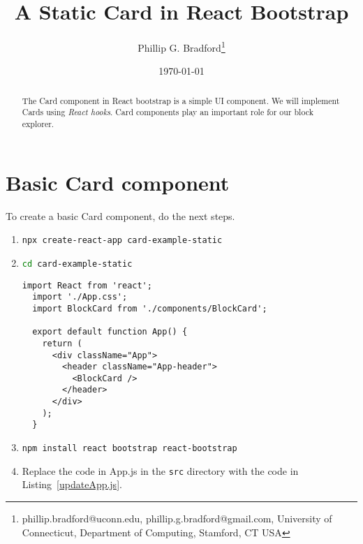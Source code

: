 \documentclass[12pt]{article}
\begin{document}
\title{A Static {\bf Card} in React Bootstrap}
\author{
Phillip G. Bradford\thanks{phillip.bradford@uconn.edu, phillip.g.bradford@gmail.com,
{\sc University of Connecticut, Department of Computing, Stamford, CT USA}}
}

\date{\small\today}

\maketitle

%
%
%
\begin{abstract}
The Card component in React bootstrap is a simple UI component.
We will implement Cards using {\em React hooks}.
Card components play an important role for our block explorer.
\end{abstract}

%
%
%
%
\section{Basic Card component}
\label{Basic Card component}


To create a basic Card component, do the next steps.

\begin{enumerate}

\item
\lstinline[language=bash]|npx create-react-app card-example-static|

\item
\lstinline[language=bash]|cd card-example-static|


\begin{lstlisting}[label=updateApp.js,style=JSES6Base, caption={Update app.js in the {\em src} folder}]
  import React from 'react';
  import './App.css';
  import BlockCard from './components/BlockCard';
  
  export default function App() {
    return (
      <div className="App">
        <header className="App-header">
          <BlockCard />
        </header>
      </div>
    );
  }
\end{lstlisting}

\item
\lstinline[language=bash]|npm install react bootstrap react-bootstrap|

\item Replace the code in App.js in the \lstinline[language=bash]|src| directory with the code
in Listing~\ref{updateApp.js}.

\end{enumerate}
\end{document}
